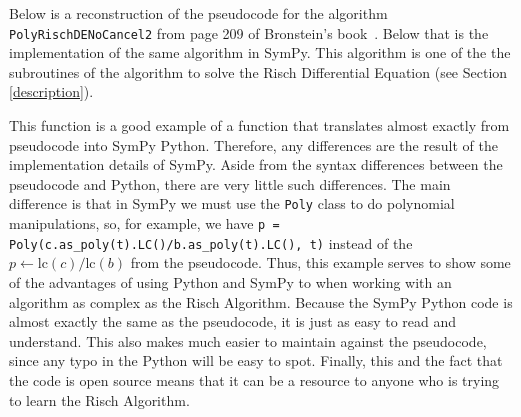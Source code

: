 Below is a reconstruction of the pseudocode for the algorithm
\texttt{Pol\-y\-Risch\-DE\-No\-Can\-cel2} from page 209 of Bronstein's
book~\cite{bronstein2005symbolic}. Below that is the implementation of
the same algorithm in SymPy.  This algorithm is one of the the
subroutines of the algorithm to solve the Risch Differential Equation
(see Section \ref{description}).  

\footnotesize


\normalsize

This function is a good example of a function that translates almost
exactly from pseudocode into SymPy Python.  Therefore, any differences
are the result of the implementation details of SymPy.  Aside from the
syntax differences between the pseudocode and Python, there are very
little such differences.  The main difference is that in SymPy we must
use the \texttt{Poly} class to do polynomial manipulations, so, for
example, we have {\tt p = Poly(c.as\_poly(t).LC()/b.as\_poly(t).LC(),
t)} instead of the $p \leftarrow \mathrm{lc}(c)/\mathrm{lc}(b)$ from the
pseudocode.  Thus, this example serves to show some of the advantages of
using Python and SymPy to when working with an algorithm as complex as
the Risch Algorithm.  Because the SymPy Python code is almost exactly
the same as the pseudocode, it is just as easy to read and understand.
This also makes much easier to maintain against the pseudocode, since
any typo in the Python will be easy to spot.  Finally, this and the fact
that the code is open source means that it can be a resource to anyone
who is trying to learn the Risch Algorithm.
